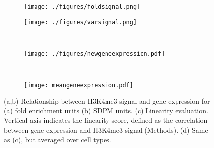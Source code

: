 \documentclass[11pt]{article}
\begin{document}
\begin{figure}[p]
\vspace{-0.5in}
	\centering
	\begin{subfigure}[b]{0.45\textwidth}
		\texttt{[image: ./figures/foldsignal.png]}
		\caption{}
		\label{fig:expressionscatter_a}
		\hfill
	\end{subfigure}
	\begin{subfigure}[b]{0.45\textwidth}
		\texttt{[image: ./figures/varsignal.png]}
		\caption{}
		\label{fig:expressionscatter_b}
		\hfill
	\end{subfigure}\\
	\begin{subfigure}[b]{0.7\textwidth}
		\texttt{[image: ./figures/newgeneexpression.pdf]}
		\caption{}
		\label{fig:binpearson}
		\hfill
	\end{subfigure}\\
	\begin{subfigure}[b]{0.6\textwidth}
		\texttt{[image: meangeneexpression.pdf]}
		\caption{}
		\label{fig:bandpearson}
	\end{subfigure}
	\caption{
	(a,b) Relationship between H3K4me3 signal and gene expression for (a) fold enrichment units (b) SDPM units.
	(c) Linearity evaluation. Vertical axis indicates the linearity score, defined as the correlation between gene expression and H3K4me3 signal (Methods). (d) Same as (c), but averaged over cell types.
}
	\label{fig:linearity}
\end{figure}
\end{document}

